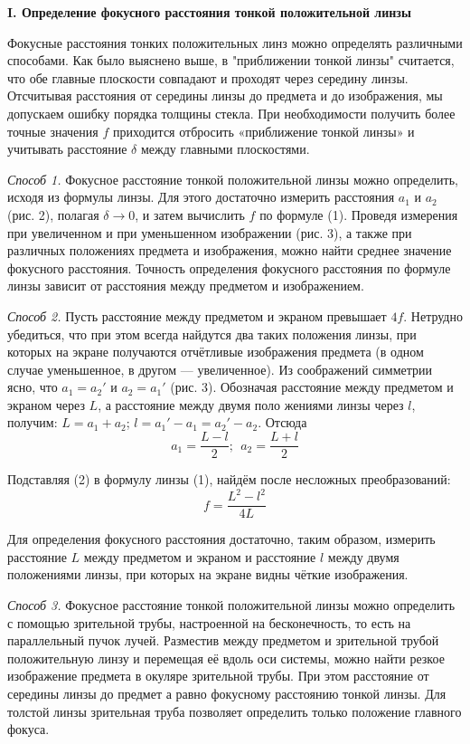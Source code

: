 \documentclass[14pt]{article}
\begin{document}
\vspace{1cm}
\textbf{I. Определение фокусного расстояния тонкой положительной линзы}

Фокусные расстояния тонких положительных линз можно определять
различными способами. Как было выяснено выше, в "приближении
тонкой линзы" считается, что обе главные плоскости совпадают и
проходят через середину линзы. Отсчитывая расстояния от середины
линзы до предмета
и до изображения, мы допускаем ошибку порядка
толщины стекла. При необходимости получить более точные значения
$f$
приходится отбросить «приближение тонкой линзы»
и учитывать расстояние
$\delta$ между главными плоскостями.

\textsl{Способ 1.} Фокусное расстояние тонкой положительной линзы можно
определить, исходя из формулы линзы. Для этого достаточно измерить
расстояния $a_1$ и $a_2$ (рис. 2), полагая $\delta \rightarrow 0$, и затем вычислить
$f$ по формуле (1).
Проведя измерения при увеличенном
и при уменьшенном изображении
(рис. 3),
а также при различных положениях
предмета и изображения, можно
найти среднее значение фокусного расстояния.
Точность определения фокусного расстояния
по формуле линзы зависит от
расстояния между предметом
и изображением.


\textsl{Способ 2.} Пусть расстояние между предметом
и экраном превышает $4f$. Нетрудно убедиться, что при этом всегда найдутся два таких
положения линзы, при
которых на экране получаются отчётливые изображения
предмета (в одном случае уменьшенное, в другом
— увеличенное). Из соображений симметрии ясно, что
$a_1 = a_2'$ и $a_2 = a_1'$ (рис. 3).
Обозначая расстояние между предметом
и экраном через
$L$, а расстояние
между двумя поло
жениями линзы через $l$, получим:
$L = a_1 + a_2$; $l = a_1' − a_1 = a_2' − a_2$. Отсюда
\begin{equation}
a_1 = \frac{L-l}{2};~~a_2 = \frac{L+l}{2}
\end{equation}

Подставляя (2) в формулу линзы (1), найдём после несложных преобразований:
\begin{equation}
f = \frac{L^2 - l^2}{4L}
\end{equation}

Для определения фокусного расстояния достаточно, таким образом, измерить
расстояние
$L$ между предметом
и экраном
и расстояние $l$ между
двумя положениями линзы, при
которых на экране видны чёткие изображения.


\textsl{Способ 3.} Фокусное расстояние тонкой положительной линзы можно
определить с помощью зрительной трубы, настроенной на бесконечность,
то есть на параллельный пучок лучей.
Разместив между предметом
и зрительной трубой положительную
линзу
и перемещая её вдоль оси системы, можно найти резкое изображение
предмета в окуляре зрительной трубы. При этом расстояние от
середины линзы до предмет
а равно фокусному расстоянию тонкой линзы.
Для толстой линзы зрительная труба позволяет определить только
положение главного фокуса.
\end{document}
